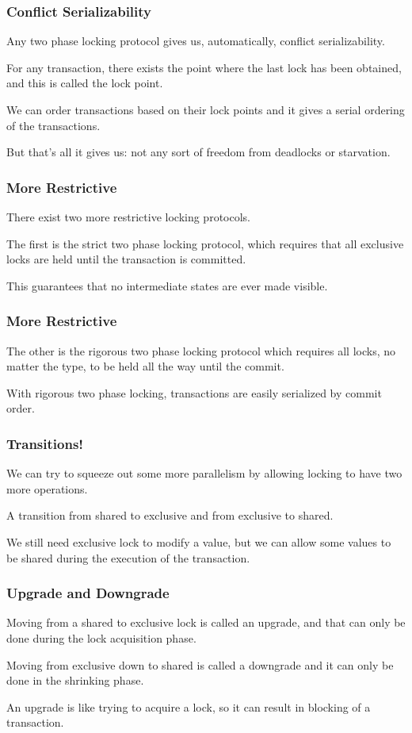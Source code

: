 \begin{frame}
\frametitle{Conflict Serializability}
Any two phase locking protocol gives us, automatically, conflict serializability. 

For any transaction, there exists the point where the last lock has been obtained, and this is called the \alert{lock point}. 

We can order transactions based on their lock points and it gives a serial ordering of the transactions. 

But that's all it gives us: not any sort of freedom from deadlocks or starvation.


\end{frame}

\begin{frame}
\frametitle{More Restrictive}

There exist two more restrictive locking protocols.

The first is the strict two phase locking protocol, which requires that all exclusive locks are held until the transaction is committed.

This guarantees that no intermediate states are ever made visible.

\end{frame}

\begin{frame}
\frametitle{More Restrictive}

The other is the rigorous two phase locking protocol which requires all locks, no matter the type, to be held all the way until the commit.

With rigorous two phase locking, transactions are easily serialized by commit order.

\end{frame}

\begin{frame}
\frametitle{Transitions!}

We can try to squeeze out some more parallelism by allowing locking to have two more operations. 

A transition from shared to exclusive and from exclusive to shared. 

We still need exclusive lock to modify a value, but we can allow some values to be shared during the execution of the transaction. 


\end{frame}

\begin{frame}
\frametitle{Upgrade and Downgrade}

Moving from a shared to exclusive lock is called an upgrade, and that can only be done during the lock acquisition phase.

 Moving from exclusive down to shared is called a downgrade and it can only be done in the shrinking phase.

An upgrade is like trying to acquire a lock, so it can result in blocking of a transaction.

\end{frame}

